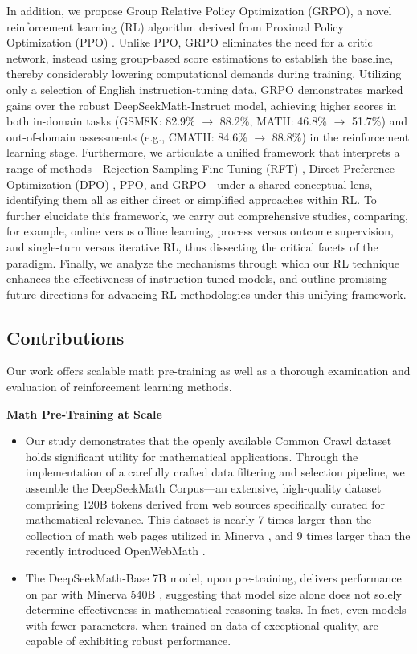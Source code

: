 In addition, we propose Group Relative Policy Optimization (GRPO), a novel reinforcement learning (RL) algorithm derived from Proximal Policy Optimization (PPO) \citep{schulman2017proximal}. Unlike PPO, GRPO eliminates the need for a critic network, instead using group-based score estimations to establish the baseline, thereby considerably lowering computational demands during training. Utilizing only a selection of English instruction-tuning data, GRPO demonstrates marked gains over the robust DeepSeekMath-Instruct model, achieving higher scores in both in-domain tasks (GSM8K: 82.9\% $\rightarrow$ 88.2\%, MATH: 46.8\% $\rightarrow$ 51.7\%) and out-of-domain assessments (e.g., CMATH: 84.6\% $\rightarrow$ 88.8\%) in the reinforcement learning stage. Furthermore, we articulate a unified framework that interprets a range of methods—Rejection Sampling Fine-Tuning (RFT) \citep{yuan2023scaling}, Direct Preference Optimization (DPO) \citep{dpo}, PPO, and GRPO—under a shared conceptual lens, identifying them all as either direct or simplified approaches within RL. To further elucidate this framework, we carry out comprehensive studies, comparing, for example, online versus offline learning, process versus outcome supervision, and single-turn versus iterative RL, thus dissecting the critical facets of the paradigm. Finally, we analyze the mechanisms through which our RL technique enhances the effectiveness of instruction-tuned models, and outline promising future directions for advancing RL methodologies under this unifying framework.

\subsection{Contributions}
Our work offers scalable math pre-training as well as a thorough examination and evaluation of reinforcement learning methods.

\textbf{Math Pre-Training at Scale}

\begin{itemize}[topsep=0pt]
    \item Our study demonstrates that the openly available Common Crawl dataset holds significant utility for mathematical applications. Through the implementation of a carefully crafted data filtering and selection pipeline, we assemble the DeepSeekMath Corpus—an extensive, high-quality dataset comprising 120B tokens derived from web sources specifically curated for mathematical relevance. This dataset is nearly 7 times larger than the collection of math web pages utilized in Minerva \citep{minerva}, and 9 times larger than the recently introduced OpenWebMath \citep{openwebmath}.

    \item The DeepSeekMath-Base 7B model, upon pre-training, delivers performance on par with Minerva 540B \citep{minerva}, suggesting that model size alone does not solely determine effectiveness in mathematical reasoning tasks. In fact, even models with fewer parameters, when trained on data of exceptional quality, are capable of exhibiting robust performance.
\end{itemize}


